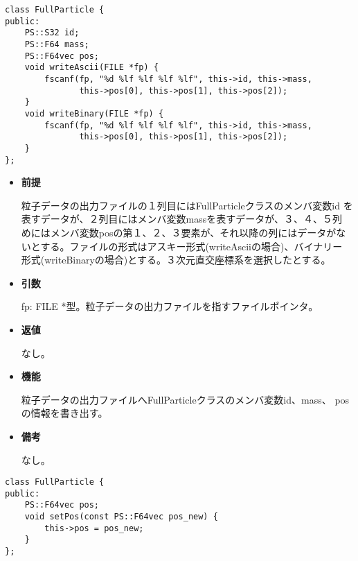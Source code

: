 
\begin{screen}
\begin{verbatim}
class FullParticle {
public:
    PS::S32 id;
    PS::F64 mass;
    PS::F64vec pos;
    void writeAscii(FILE *fp) {
        fscanf(fp, "%d %lf %lf %lf %lf", this->id, this->mass,
               this->pos[0], this->pos[1], this->pos[2]);
    }
    void writeBinary(FILE *fp) {
        fscanf(fp, "%d %lf %lf %lf %lf", this->id, this->mass,
               this->pos[0], this->pos[1], this->pos[2]);
    }
};
\end{verbatim}
\end{screen}

\begin{itemize}

\item {\bf 前提}

  粒子データの出力ファイルの１列目にはFullParticleクラスのメンバ変数id
  を表すデータが、２列目にはメンバ変数massを表すデータが、３、４、５列
  めにはメンバ変数posの第１、２、３要素が、それ以降の列にはデータがな
  いとする。ファイルの形式はアスキー形式(writeAsciiの場合)、バイナリー
  形式(writeBinaryの場合)とする。３次元直交座標系を選択したとする。

\item {\bf 引数}

  fp: FILE *型。粒子データの出力ファイルを指すファイルポインタ。
  
\item {\bf 返値}

  なし。
  
\item {\bf 機能}

  粒子データの出力ファイルへFullParticleクラスのメンバ変数id、mass、
  posの情報を書き出す。
  
\item {\bf 備考}

  なし。
  
\end{itemize}



\begin{screen}
\begin{verbatim}
class FullParticle {
public:
    PS::F64vec pos;
    void setPos(const PS::F64vec pos_new) {
        this->pos = pos_new;
    }
};
\end{verbatim}
\end{screen}

